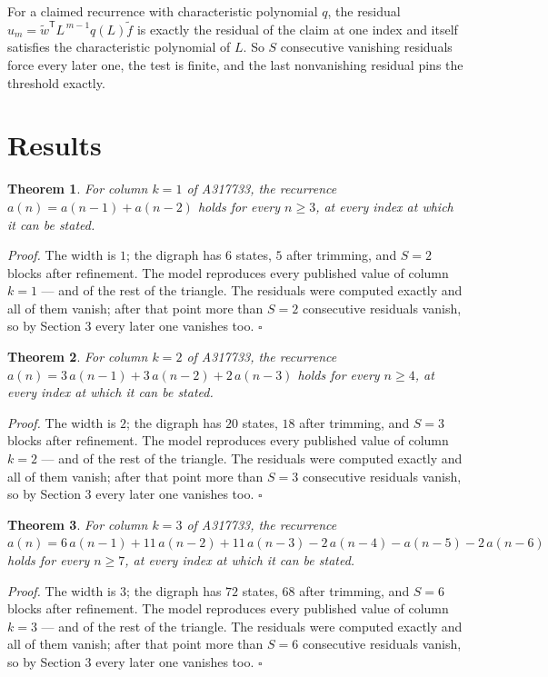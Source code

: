 \documentclass[11pt]{article}
\newtheorem{theorem}{Theorem}
\theoremstyle{definition}
\begin{document}
For a claimed recurrence with characteristic polynomial $q$, the residual $u_m = \tilde w^{\mathsf T}L^{\,m-1}q(L)\tilde f$ is exactly the residual of the claim at one index and itself satisfies the characteristic polynomial of $L$. So $S$ consecutive vanishing residuals force every later one, the test is finite, and the last nonvanishing residual pins the threshold exactly.

\section{Results}

\begin{theorem} For column $k = 1$ of A317733, the recurrence $a(n) = a(n-1) + a(n-2)$ holds for every $n \ge 3$, at every index at which it can be stated.\end{theorem}

{\itshape Proof.} The width is $1$; the digraph has $6$ states, $5$ after trimming, and $S = 2$ blocks after refinement. The model reproduces every published value of column $k = 1$ --- and of the rest of the triangle. The residuals were computed exactly and all of them vanish; after that point more than $S = 2$ consecutive residuals vanish, so by Section 3 every later one vanishes too. $\square$

\begin{theorem} For column $k = 2$ of A317733, the recurrence $a(n) = 3\,a(n-1) + 3\,a(n-2) + 2\,a(n-3)$ holds for every $n \ge 4$, at every index at which it can be stated.\end{theorem}

{\itshape Proof.} The width is $2$; the digraph has $20$ states, $18$ after trimming, and $S = 3$ blocks after refinement. The model reproduces every published value of column $k = 2$ --- and of the rest of the triangle. The residuals were computed exactly and all of them vanish; after that point more than $S = 3$ consecutive residuals vanish, so by Section 3 every later one vanishes too. $\square$

\begin{theorem} For column $k = 3$ of A317733, the recurrence $a(n) = 6\,a(n-1) + 11\,a(n-2) + 11\,a(n-3) - 2\,a(n-4) - a(n-5) - 2\,a(n-6)$ holds for every $n \ge 7$, at every index at which it can be stated.\end{theorem}

{\itshape Proof.} The width is $3$; the digraph has $72$ states, $68$ after trimming, and $S = 6$ blocks after refinement. The model reproduces every published value of column $k = 3$ --- and of the rest of the triangle. The residuals were computed exactly and all of them vanish; after that point more than $S = 6$ consecutive residuals vanish, so by Section 3 every later one vanishes too. $\square$
\end{document}
